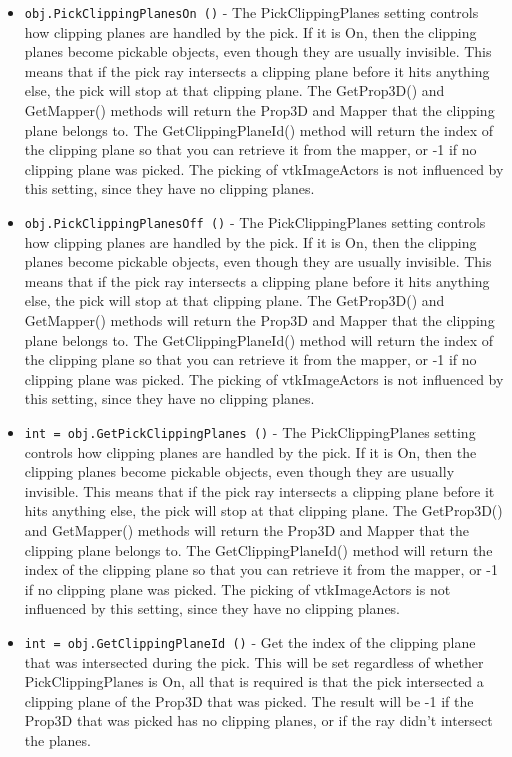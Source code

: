 \begin{itemize}
\item  \verb|obj.PickClippingPlanesOn ()| -  The PickClippingPlanes setting controls how clipping planes are
 handled by the pick.  If it is On, then the clipping planes become
 pickable objects, even though they are usually invisible.  This
 means that if the pick ray intersects a clipping plane before it
 hits anything else, the pick will stop at that clipping plane.
 The GetProp3D() and GetMapper() methods will return the Prop3D
 and Mapper that the clipping plane belongs to.  The
 GetClippingPlaneId() method will return the index of the clipping
 plane so that you can retrieve it from the mapper, or -1 if no
 clipping plane was picked. The picking of vtkImageActors is not
 influenced by this setting, since they have no clipping planes.

\item  \verb|obj.PickClippingPlanesOff ()| -  The PickClippingPlanes setting controls how clipping planes are
 handled by the pick.  If it is On, then the clipping planes become
 pickable objects, even though they are usually invisible.  This
 means that if the pick ray intersects a clipping plane before it
 hits anything else, the pick will stop at that clipping plane.
 The GetProp3D() and GetMapper() methods will return the Prop3D
 and Mapper that the clipping plane belongs to.  The
 GetClippingPlaneId() method will return the index of the clipping
 plane so that you can retrieve it from the mapper, or -1 if no
 clipping plane was picked. The picking of vtkImageActors is not
 influenced by this setting, since they have no clipping planes.

\item  \verb|int = obj.GetPickClippingPlanes ()| -  The PickClippingPlanes setting controls how clipping planes are
 handled by the pick.  If it is On, then the clipping planes become
 pickable objects, even though they are usually invisible.  This
 means that if the pick ray intersects a clipping plane before it
 hits anything else, the pick will stop at that clipping plane.
 The GetProp3D() and GetMapper() methods will return the Prop3D
 and Mapper that the clipping plane belongs to.  The
 GetClippingPlaneId() method will return the index of the clipping
 plane so that you can retrieve it from the mapper, or -1 if no
 clipping plane was picked. The picking of vtkImageActors is not
 influenced by this setting, since they have no clipping planes.

\item  \verb|int = obj.GetClippingPlaneId ()| -  Get the index of the clipping plane that was intersected during
 the pick.  This will be set regardless of whether PickClippingPlanes
 is On, all that is required is that the pick intersected a clipping
 plane of the Prop3D that was picked.  The result will be -1 if the
 Prop3D that was picked has no clipping planes, or if the ray didn't
 intersect the planes.


\end{itemize}
